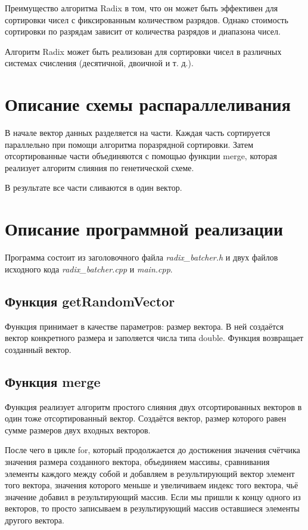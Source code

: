 \documentclass{report}
\begin{document}
\par Преимущество алгоритма Radix в том, что он может быть эффективен для сортировки чисел с фиксированным количеством разрядов. Однако стоимость сортировки по разрядам зависит от количества разрядов и диапазона чисел.
\par Алгоритм Radix может быть реализован для сортировки чисел в различных системах счисления (десятичной, двоичной и т. д.).

\newpage

\section*{Описание схемы распараллеливания}

\par В начале вектор данных разделяется на части. Каждая часть сортируется параллельно при помощи алгоритма поразрядной сортировки. Затем отсортированные части объединяются с помощью функции merge, которая реализует алгоритм слияния по генетической схеме.
\par В результате все части сливаются в один вектор.
\newpage

\section*{Описание программной реализации}

\par Программа состоит из заголовочного файла \emph{radix\_batcher.h} и двух файлов исходного кода \emph{radix\_batcher.cpp} и \emph{main.cpp}.

\subsection*{Функция getRandomVector} 
Функция принимает в качестве параметров: размер вектора. В ней создаётся вектор конкретного размера и заполяется числа типа double. Функция возвращает созданный вектор.

\subsection*{Функция merge}
\par Функция реализует алгоритм простого слияния двух отсортированных векторов в один тоже отсортированный вектор.
Создаётся вектор, размер которого равен сумме размеров двух входных векторов.
\par После чего в цикле for, который продолжается до достижения значения счётчика значения размера созданного вектора, объединяем массивы, сравнивания элементы каждого между собой и добавляем в результирующий вектор элемент того вектора, значения которого меньше и увеличиваем индекс того вектора, чьё значение добавил в результирующий массив. Если мы пришли к концу одного из векторов, то просто записываем в результирующий массив оставшиеся элементы другого вектора.
\end{document}
